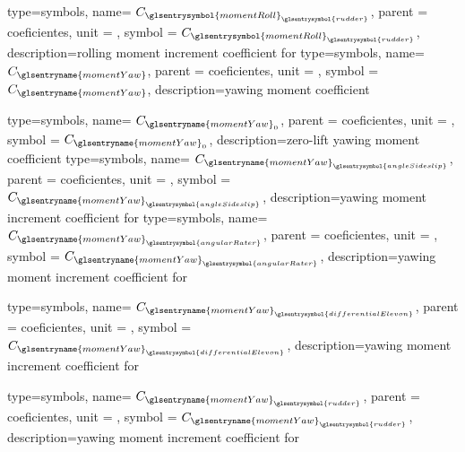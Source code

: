 {type=symbols,
    name= \ensuremath{C_{{\glsentrysymbol{momentRoll}}_{\glsentrysymbol{rudder}}}},
    parent = {coeficientes},
    unit = \unexpanded{},
    symbol = \ensuremath{C_{{\glsentrysymbol{momentRoll}}_{\glsentrysymbol{rudder}}}},
    description={rolling moment increment coefficient for }
}
{type=symbols,
    name= \ensuremath{C_\glsentryname{momentYaw}},
    parent = {coeficientes},
    unit = \unexpanded{},
    symbol = \ensuremath{C_\glsentryname{momentYaw}},
    description={yawing moment coefficient}
}

{type=symbols,
    name= \ensuremath{C_{\glsentryname{momentYaw}_{0}}},
    parent = {coeficientes},
    unit = \unexpanded{},
    symbol = \ensuremath{C_{\glsentryname{momentYaw}_{0}}},
    description={zero-lift yawing moment coefficient}
}
{type=symbols,
    name= \ensuremath{C_{{\glsentryname{momentYaw}}_{\glsentrysymbol{angleSideslip}}}},
    parent = {coeficientes},
    unit = \unexpanded{},
    symbol = \ensuremath{C_{{\glsentryname{momentYaw}}_{\glsentrysymbol{angleSideslip}}}},
    description={yawing moment increment coefficient for }
}
{type=symbols,
    name= \ensuremath{C_{{\glsentryname{momentYaw}}_{\glsentrysymbol{angularRater}}}},
    parent = {coeficientes},
    unit = \unexpanded{},
    symbol = \ensuremath{C_{{\glsentryname{momentYaw}}_{\glsentrysymbol{angularRater}}}},
    description={yawing moment increment coefficient for }
}

{type=symbols,
    name= \ensuremath{C_{{\glsentryname{momentYaw}}_{\glsentrysymbol{differentialElevon}}}},
    parent = {coeficientes},
    unit = \unexpanded{},
    symbol = \ensuremath{C_{{\glsentryname{momentYaw}}_{\glsentrysymbol{differentialElevon}}}},
    description={yawing moment increment coefficient for }
}

{type=symbols,
    name= \ensuremath{C_{{\glsentryname{momentYaw}}_{\glsentrysymbol{rudder}}}},
    parent = {coeficientes},
    unit = \unexpanded{},
    symbol = \ensuremath{C_{{\glsentryname{momentYaw}}_{\glsentrysymbol{rudder}}}},
    description={yawing moment increment coefficient for }
}

